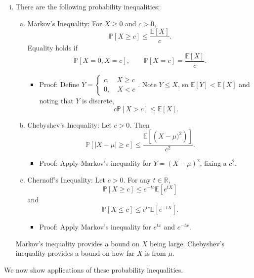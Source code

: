 \documentclass{tufte-handout}
\newcommand*\R{\mathbb{R}}
\newcommand*\E{\mathbb{E}}
\renewcommand{\P}{\mathbb{P}}
\theoremstyle{definition}
\begin{document}
\begin{enumerate}[(i)]
		Returning to our example,
		\begin{align*}
			\E\left[Z^+\right] &= 0 \cdot \P\left[Z^+ = 0\right] + \int_{0}^{\infty} x \frac{1}{\sqrt{2\pi} } e^{-\frac{x^2}{2}}dx  \\
			&= \left.\frac{1}{\sqrt{2\pi} } -e^{-\frac{y^2}{2}} \right|_0^{\infty} = \frac{1}{\sqrt{2\pi} }
		.\end{align*}
	\item There are the following probability inequalities:
		\begin{enumerate}[(a)]
			\item Markov's Inequality: For $X \ge 0$ and $c > 0$, \[
				\P\left[X \ge c\right] \le \frac{\E\left[X\right] }{c}
				.\] Equality holds if \[\P\left[X = 0, X = c\right],\qquad \P\left[X = c\right] = \frac{\E\left[X\right] }{c}.\]
			\begin{itemize}
				\item Proof: Define $Y = \begin{cases}
					c, \quad X \ge c \\ 0, \quad X < c
				\end{cases}$. Note $Y \le X$, so $\E\left[Y\right] < \E\left[X\right]$ and noting that $Y$ is discrete, \[
					c \P\left[X > c\right] \le \E\left[X\right] 
				.\] 
			\end{itemize}
			\item Chebyshev's Inequality: Let $c > 0$. Then \[
				\P\left[\left| X - \mu \right| \ge c\right] \le \frac{\E\left[\left( X-\mu)^2 \right)\right] }{c^2}
			.\]
			\begin{itemize}
				\item Proof: Apply Markov's inequality for $Y = \left( X-\mu \right)^2$, fixing a $c^2$. 
			\end{itemize}
			\item Chernoff's Inequality: Let $c > 0$. For any $t \in \R$, \[
				\P\left[X \ge c\right] \le e^{-t c} \E\left[e^{tX}\right] 
			\] and \[
				\P\left[X \le c\right] \le e^{tc} \E\left[e^{-tX}\right] 
			.\] 
			\begin{itemize}
				\item Proof: Apply Markov's inequality for $e^{tx}$ and $e^{-tx}$.
			\end{itemize}
		\end{enumerate}
		Markov's inequality provides a bound on $X$ being large. Chebyshev's inequality provides a bound on how far $X$ is from $\mu$.
\end{enumerate}

We now show applications of these probability inequalities. 
\end{document}
